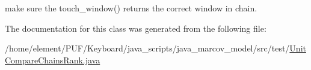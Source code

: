 make sure the touch\+\_\+window() returns the correct window in chain. 



The documentation for this class was generated from the following file\+:\begin{DoxyCompactItemize}
\item 
/home/element/\+P\+U\+F/\+Keyboard/java\+\_\+scripts/java\+\_\+marcov\+\_\+model/src/test/\hyperlink{_unit_compare_chains_rank_8java}{Unit\+Compare\+Chains\+Rank.\+java}\end{DoxyCompactItemize}
